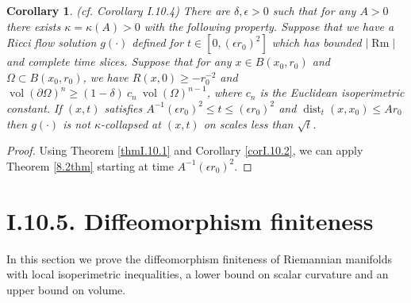 \documentclass[12pt]{amsart}
\newcommand{\dist}{\operatorname{dist}}
\newcommand{\Rm}{\operatorname{Rm}}
\newcommand{\vol}{\operatorname{vol}}
\numberwithin{equation}{section}
\theoremstyle{plain}
\newtheorem{corollary}[equation]{Corollary}
\theoremstyle{definition}
\theoremstyle{remark}
\begin{document}
\begin{corollary} (cf. Corollary I.10.4)
There are $\delta,\epsilon > 0$ such that for any $A > 0$ there exists
$\kappa = \kappa(A) > 0$ with the following property.  
Suppose that we have a Ricci flow solution
$g(\cdot)$ defined for $t \in [0, (\epsilon r_0)^2]$ which
has bounded $|\Rm|$ and complete time slices. Suppose that
for any $x \in B(x_0, r_0)$ and $\Omega \subset B(x_0, r_0)$,
we have $R(x,0) \ge - r_0^{-2}$ and $\vol(\partial \Omega)^n
\ge (1-\delta) \: c_n \: \vol(\Omega)^{n-1}$, where $c_n$ is the
Euclidean isoperimetric constant. If $(x,t)$ satisfies
$A^{-1} (\epsilon r_0)^2 \le t \le (\epsilon r_0)^2$ and
$\dist_t(x, x_0) \le A r_0$ then $g(\cdot)$ is not
$\kappa$-collapsed at $(x,t)$ on scales less than $\sqrt{t}$.
\end{corollary}
\begin{proof}
Using Theorem \ref{thmI.10.1} and
Corollary \ref{corI.10.2}, we can apply
Theorem \ref{8.2thm} starting at time $A^{-1} (\epsilon r_0)^2$.
\end{proof}

\section{I.10.5. Diffeomorphism finiteness}
\label{I.10.5}

In this section we prove the diffeomorphism finiteness of Riemannian
manifolds with local isoperimetric inequalities, a lower bound on 
scalar curvature and an upper bound on volume.
\end{document}
